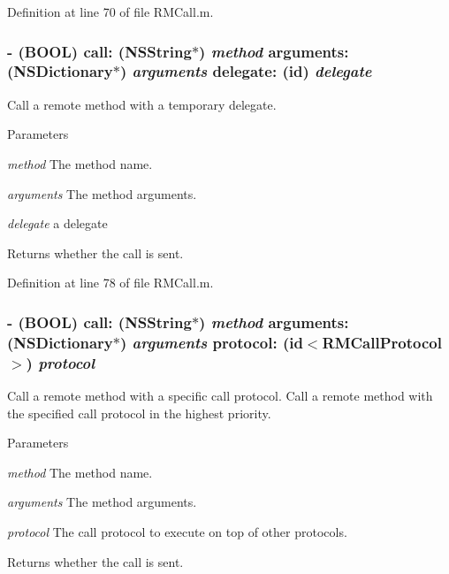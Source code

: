 Definition at line 70 of file RMCall.m.\hypertarget{interface_r_m_call_a45876bba77d77d080a2a15cd38c77358}{
\subsubsection[{call:arguments:delegate:}]{\setlength{\rightskip}{0pt plus 5cm}-\/ (BOOL) call: (NSString$\ast$) {\em method}\/ arguments: (NSDictionary$\ast$) {\em arguments}\/ delegate: (id) {\em delegate}}}
\label{interface_r_m_call_a45876bba77d77d080a2a15cd38c77358}


Call a remote method with a temporary delegate. 
\begin{DoxyParams}{Parameters}
\item[{\em method}]The method name. \item[{\em arguments}]The method arguments. \item[{\em delegate}]a delegate\end{DoxyParams}
\begin{DoxyReturn}{Returns}
whether the call is sent. 
\end{DoxyReturn}


Definition at line 78 of file RMCall.m.\hypertarget{interface_r_m_call_ab9818645989afce7fc2327926d4024b8}{
\subsubsection[{call:arguments:protocol:}]{\setlength{\rightskip}{0pt plus 5cm}-\/ (BOOL) call: (NSString$\ast$) {\em method}\/ arguments: (NSDictionary$\ast$) {\em arguments}\/ protocol: (id$<${\bf RMCallProtocol}$>$) {\em protocol}}}
\label{interface_r_m_call_ab9818645989afce7fc2327926d4024b8}


Call a remote method with a specific call protocol. Call a remote method with the specified call protocol in the highest priority.


\begin{DoxyParams}{Parameters}
\item[{\em method}]The method name. \item[{\em arguments}]The method arguments. \item[{\em protocol}]The call protocol to execute on top of other protocols.\end{DoxyParams}
\begin{DoxyReturn}{Returns}
whether the call is sent. 
\end{DoxyReturn}


